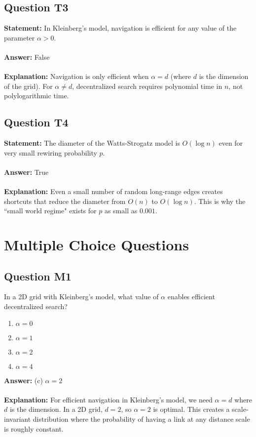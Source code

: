 \documentclass[11pt,a4paper]{article}
\theoremstyle{definition}
\begin{document}
\subsection{Question T3}
\textbf{Statement:} In Kleinberg's model, navigation is efficient for any value of the parameter $\alpha > 0$.\\
\\
\textbf{Answer:} False\\
\\
\textbf{Explanation:} Navigation is only efficient when $\alpha = d$ (where $d$ is the dimension of the grid). For $\alpha \neq d$, decentralized search requires polynomial time in $n$, not polylogarithmic time.
\subsection{Question T4}
\textbf{Statement:} The diameter of the Watts-Strogatz model is $O(\log n)$ even for very small rewiring probability $p$.\\
\\
\textbf{Answer:} True\\
\\
\textbf{Explanation:} Even a small number of random long-range edges creates shortcuts that reduce the diameter from $O(n)$ to $O(\log n)$. This is why the ``small world regime" exists for $p$ as small as $0.001$.
\section{Multiple Choice Questions}
\subsection{Question M1}
In a 2D grid with Kleinberg's model, what value of $\alpha$ enables efficient decentralized search?
\begin{enumerate}[label=(\alph*)]
\item $\alpha = 0$
\item $\alpha = 1$
\item $\alpha = 2$
\item $\alpha = 4$
\end{enumerate}
\textbf{Answer:} (c) $\alpha = 2$\\
\\
\textbf{Explanation:} For efficient navigation in Kleinberg's model, we need $\alpha = d$ where $d$ is the dimension. In a 2D grid, $d = 2$, so $\alpha = 2$ is optimal. This creates a scale-invariant distribution where the probability of having a link at any distance scale is roughly constant.
\end{document}
